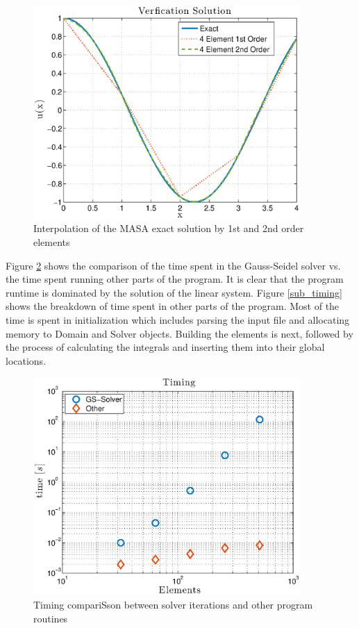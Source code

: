 \documentclass[12pt]{article}
\begin{document}
\begin{figure}[H] %
   \centering
   \includegraphics[width=4in]{interpolation.eps} 
   \caption{Interpolation of the MASA exact solution by 1st and 2nd order elements}
   \label{fig:interpolation}
\end{figure}

Figure \ref{fig:timing} shows the comparison of the time spent in the Gauss-Seidel solver vs. the time spent running other parts of the program.  It is clear that the program runtime is dominated by the solution of the linear system.  Figure \ref{sub_timing} shows the breakdown of time spent in other parts of the program.  Most of the time is spent in initialization which includes parsing the input file and allocating memory to Domain and Solver objects.  Building the elements is next, followed by the process of calculating the integrals and inserting them into their global locations.

\begin{figure}[!htbp] %
   \centering
   \includegraphics[width=4in]{timing.eps} 
   \caption{Timing compariSson between solver iterations and other program routines}
   \label{fig:timing}
\end{figure}
\end{document}
